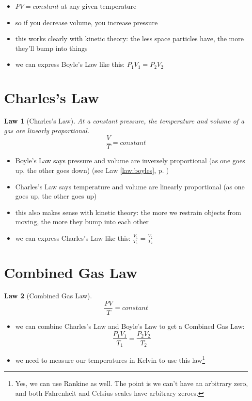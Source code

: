 \documentclass[11pt, oneside]{article}   	%
\newtheorem{law}{Law}
\begin{document}
\begin{itemize}
\item $P V = constant$ at any given temperature
\item so if you decrease volume, you increase pressure
\item this works clearly with kinetic theory: the less space particles have, the more they'll bump into things
\item we can express Boyle's Law like this: $P_1 V_1 = P_2 V_2$
\end{itemize}

\section{Charles's Law}

\begin{law}[Charles's Law]\label{law:charles}
At a constant pressure, the temperature and volume of a gas are linearly proportional.\\
$$\frac{V}{T} = constant$$
\end{law}

\begin{itemize}
\item Boyle's Law says pressure and volume are inversely proportional (as one goes up, the other goes down) (see Law \ref{law:boyles}, p. \pageref{law:boyles})
\item Charles's Law says temperature and volume are linearly proportional (as one goes up, the other goes up) 
\item this also makes sense with kinetic theory: the more we restrain objects from moving, the more they bump into each other
\item we can express Charles's Law like this: $\frac{V_1}{T_1} = \frac{V_2}{T_2}$
\end{itemize}

\section{Combined Gas Law}

\begin{law}[Combined Gas Law]\label{law:gas:combined}
$$\frac{P V}{T} = constant$$
\end{law}

\begin{itemize}
\item we can combine Charles's Law and Boyle's Law to get a Combined Gas Law:\\
$$\frac{P_1 V_1}{T_1} = \frac{P_2 V_2}{T_2}$$
\item we need to measure our temperatures in Kelvin to use this law\footnote{Yes, we can use Rankine as well. The point is we can't have an arbitrary zero, and both Fahrenheit and Celsius scales have arbitrary zeroes.}
\end{itemize}
\end{document}
